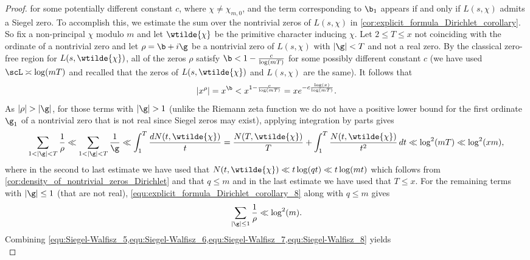 \begin{proof}
        for some potentially different constant $c$, where $\chi \neq \chi_{m,0}$, and the term corresponding to $\b_{1}$ appears if and only if $L(s,\chi)$ admits a Siegel zero. To accomplish this, we estimate the sum over the nontrivial zeros of $L(s,\chi)$ in \cref{cor:explicit_formula_Dirichlet_corollary}. So fix a non-principal $\chi$ modulo $m$ and let $\wtilde{\chi}$ be the primitive character inducing $\chi$. Let $2 \le T \le x$ not coinciding with the ordinate of a nontrivial zero and let $\rho = \b+i\g$ be a nontrivial zero of $L(s,\chi)$ with $|\g| < T$ and not a real zero. By the classical zero-free region for $L(s,\wtilde{\chi})$, all of the zeros $\rho$ satisfy $\b < 1-\frac{c}{\log(mT)}$ for some possibly different constant $c$ (we have used $\scL \asymp \log(mT)$ and recalled that the zeros of $L(s,\wtilde{\chi})$ and $L(s,\chi)$ are the same). It follows that
        \begin{equation}\label{equ:Siegel-Walfisz_6}
          |x^{\rho}| = x^{\b} < x^{1-\frac{c}{\log(mT)}} = xe^{-c\frac{\log(x)}{\log(mT)}}.
        \end{equation}
        As $|\rho| > |\g|$, for those terms with $|\g| > 1$ (unlike the Riemann zeta function we do not have a positive lower bound for the first ordinate $\g_{1}$ of a nontrivial zero that is not real since Siegel zeros may exist), applying integration by parts gives
        \begin{equation}\label{equ:Siegel-Walfisz_7}
          \sum_{1 < |\g| < T}\frac{1}{\rho} \ll \sum_{1 < |\g| < T}\frac{1}{\g} \ll \int_{1}^{T}\frac{dN(t,\wtilde{\chi})}{t} = \frac{N(T,\wtilde{\chi})}{T}+\int_{1}^{T}\frac{N(t,\wtilde{\chi})}{t^{2}}\,dt \ll \log^{2}(mT) \ll \log^{2}(xm),
        \end{equation}
        where in the second to last estimate we have used that $N(t,\wtilde{\chi}) \ll t\log(qt) \ll t\log(mt)$ which follows from \cref{cor:density_of_nontrivial_zeros_Dirichlet} and that $q \le m$ and in the last estimate we have used that $T \le x$. For the remaining terms with $|\g| \le 1$ (that are not real), \cref{equ:explicit_formula_Dirichlet_corollary_8} along with $q \le m$ gives
        \begin{equation}\label{equ:Siegel-Walfisz_8}
          \sum_{|\g| \le 1}\frac{1}{\rho} \ll \log^{2}(m).
        \end{equation}
        Combining \cref{equ:Siegel-Walfisz_5,equ:Siegel-Walfisz_6,equ:Siegel-Walfisz_7,equ:Siegel-Walfisz_8} yields
        \begin{equation}\label{equ:Siegel-Walfisz_9}

\end{equation}
\end{proof}
